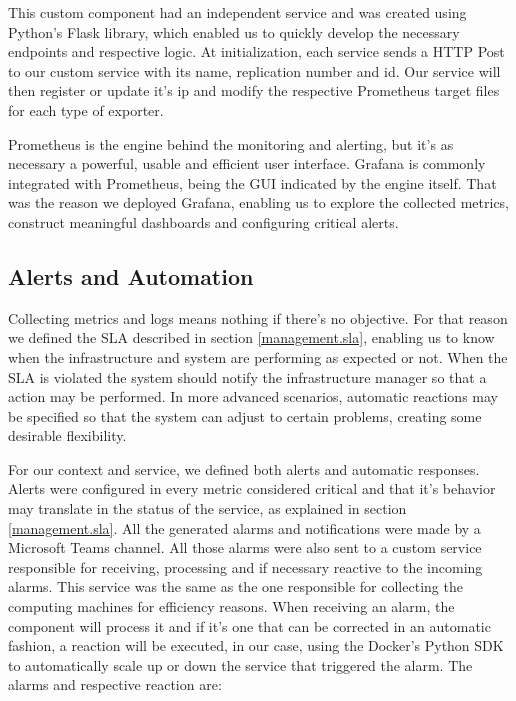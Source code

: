 \documentclass[12pt]{article}
\begin{document}
This custom component had an independent service and was created using Python's Flask library, which enabled us to quickly develop the necessary endpoints and respective logic. At initialization, each service sends a HTTP Post to our custom service with its name, replication number and id. Our service will then register or update it's ip and modify the respective Prometheus target files for each type of exporter.

Prometheus is the engine behind the monitoring and alerting, but it's as necessary a powerful, usable and efficient user interface. Grafana is commonly integrated with Prometheus, being the GUI indicated by the engine itself. That was the reason we deployed Grafana, enabling us to explore the collected metrics, construct meaningful dashboards and configuring critical alerts.

\subsection{Alerts and Automation} \label{management.automation} %

Collecting metrics and logs means nothing if there's no objective. For that reason we defined the SLA described in section \ref{management.sla}, enabling us to know when the infrastructure and system are performing as expected or not. When the SLA is violated the system should notify the infrastructure manager so that a action may be performed. In more advanced scenarios, automatic reactions may be specified so that the system can adjust to certain problems, creating some desirable flexibility.

For our context and service, we defined both alerts and automatic responses. Alerts were configured in every metric considered critical and that it's behavior may translate in the status of the service, as explained in section \ref{management.sla}. All the generated alarms and notifications were made by a Microsoft Teams channel. All those alarms were also sent to a custom service responsible for receiving, processing and if necessary reactive to the incoming alarms. This service was the same as the one responsible for collecting the computing machines for efficiency reasons. When receiving an alarm, the component will process it and if it's one that can be corrected in an automatic fashion, a reaction will be executed, in our case, using the Docker's Python SDK to automatically scale up or down the service that triggered the alarm. The alarms and respective reaction are:
\end{document}
